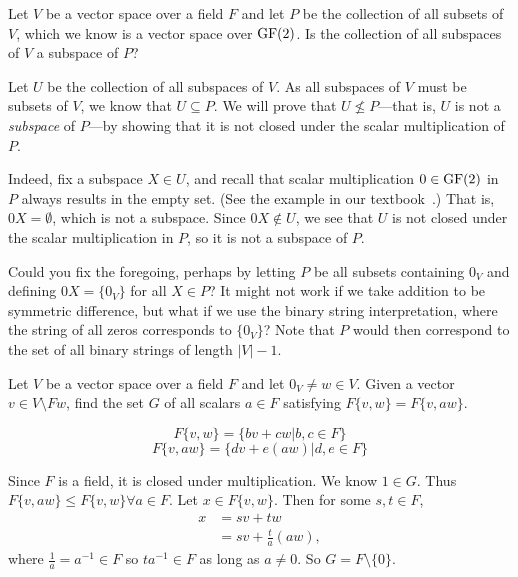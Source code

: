 \begin{problem}[Golan 93]
\label{prob:9}
Let $V$ be a vector space over a field $F$ and let $P$ be the collection of all
subsets of $V$, which we know is a vector space over $\operatorname{GF}(2)$.  Is the
collection of all subspaces of $V$ a subspace of $P$?

\end{problem}
\smallskip
\begin{solution}
Let $U$ be the collection of all subspaces of $V$. As all subspaces of $V$ must
be subsets of $V$, we know that $U \subseteq P$. We will prove that 
$U\nleq P$---that is, $U$ is not a \emph{subspace} of $P$---by showing that it
is not closed under the scalar multiplication of $P$.  

Indeed, fix a subspace $X \in U$, and recall that 
scalar multiplication $0 \in \operatorname{GF}(2)$ in $P$ always  
results in the empty set. (See the example in our textbook~\cite[p.~24]{Golan:2012}.)
That is, $0X = \emptyset$, which is not a subspace.
Since $0X\notin U$, we see that $U$ is not closed under the scalar
multiplication in $P$, so it is not a subspace of $P$.

\bigskip

 Could you fix the foregoing, perhaps by
letting $P$ be all subsets containing $0_V$ and defining $0X = \{0_V\}$ for
all $X \in P$?  It might not work if we take addition to be symmetric
difference, but what if we use the binary string interpretation, where the
string of all zeros corresponds to $\{0_V\}$?  Note that $P$ would then correspond to
the set of all binary strings of length $|V|-1$.
\end{solution}
\probskip



\begin{problem}[Golan 105]

Let $V$ be a vector space over a field $F$ and let $0_V \neq w \in V$.  Given a
vector $v \in V \setminus Fw$, find the set $G$ of all scalars $a \in F$
satisfying $F\{v, w\} = F\{v, aw\}$.

\end{problem}
\smallskip
\begin{solution}

$$F\{v,w\} = \{bv + cw | b,c \in F \} $$
$$F\{v,aw\} = \{dv + e(aw) | d,e \in F\}$$

Since $F$ is a field, it is closed under multiplication. We know $1 \in G$. Thus $F\{v,aw\} \leq F\{v,w\} \forall a \in F$. Let $x \in F\{v,w\}$. Then for some $s,t \in F$,
\begin{align*}
x & =  sv + tw  \\
  & =  sv + \frac{t}{a}(aw),
\end{align*}
where $\frac{1}{a}=a^{-1} \in F$ so $ta^{-1} \in F$ as long as $a \neq 0$. So $G = F \setminus \{0\}$.
\end{solution}
\probskip


